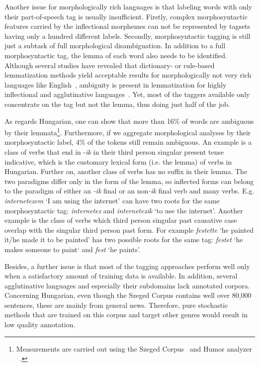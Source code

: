Another issue for morphologically rich languages is that labeling words with only their part-of-speech tag is usually insufficient. 
Firstly, complex morphosyntactic features carried by the inflectional morphemes can not be represented by tagsets having only a hundred different labels. 
Secondly, morphosyntactic tagging is still just a subtask of full morphological disambiguation. 
In addition to a full morphosyntactic tag, the lemma of each word also needs to be identified. Although several studies have revealed that dictionary- or rule-based lemmatization methods yield acceptable results for morphologically not very rich languages like English~\cite{Porter1980,Plisson2004}, ambiguity is present in lemmatization for highly inflectional and agglutinative languages~\cite{Jursic2007,Sak2007,Chrupaa2008}. 
Yet, most of the taggers available only concentrate on the tag but not the lemma, thus doing just half of the job.

As regards Hungarian, one can show that more than 16\% of words are ambiguous by their lemmata\footnote{Measurements are carried out using the  Szeged Corpus~\cite{Csendes2004} and Humor analyzer ~\cite{Proszeky1994,Novak2003}.}. 
Furthermore, if we aggregate morphological analyses by their morphosyntactic label, 4\% of the tokens still remain ambiguous. 
An example is a class of verbs that end in -\emph{ik} in their third person singular present tense indicative, which is the customary lexical form (i.e. the lemma) of verbs in Hungarian. Further on, another class of verbs has no suffix in their lemma. 
The two paradigms differ only in the form of the lemma, so inflected forms can belong to the paradigm of either an \emph{-ik} final or an non\emph{-ik} final verb and many verbs. 
E.g. \emph{internetezem} `I am using the internet' can have two roots for the same morphosyntactic tag: \emph{internetez} and \emph{internetezik} `to use the internet'.
Another example is the class of verbs which third person singular past causative case overlap with the singular third person past form. 
For example \emph{festette} `he painted it/he made it to be painted' has two possible roots for the same tag: \emph{festet} `he makes someone to paint` and \emph{fest} `he paints'.  

Besides, a further issue is that most of the tagging approaches perform well only when a satisfactory amount of training data is available. 
In addition, several agglutinative languages and especially their subdomains lack annotated corpora. 
Concerning Hungarian, even though the Szeged Corpus contains well over 80,000 sentences, these are mainly from general news. 
Therefore, pure stochastic methods that are trained on this corpus and target other genres would result in low quality annotation. 

